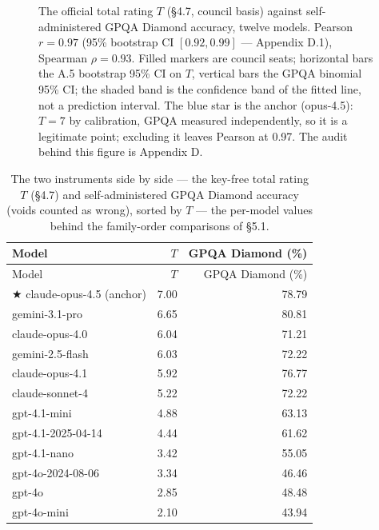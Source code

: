 \begin{figure}
\centering
{}
\caption{The official total rating \(T\) (§4.7, council basis) against self-administered GPQA Diamond accuracy, twelve models. Pearson \(r = 0.97\) (95\% bootstrap CI \([0.92, 0.99]\) --- Appendix D.1), Spearman \(\rho = 0.93\). Filled markers are council seats; horizontal bars the A.5 bootstrap 95\% CI on \(T\), vertical bars the GPQA binomial 95\% CI; the shaded band is the confidence band of the fitted line, not a prediction interval. The blue star is the anchor (opus-4.5): \(T = 7\) by calibration, GPQA measured independently, so it is a legitimate point; excluding it leaves Pearson at 0.97. The audit behind this figure is Appendix D.}
\end{figure}

\protect{}\label{tab-gpqa-values}{}

\begin{longtable}[]{@{}lrr@{}}
\caption{The two instruments side by side --- the key-free total rating \(T\) (§4.7) and self-administered GPQA Diamond accuracy (voids counted as wrong), sorted by \(T\) --- the per-model values behind the family-order comparisons of §5.1.}\tabularnewline
\toprule\noalign{}
Model & \(T\) & GPQA Diamond (\%) \\
\midrule\noalign{}
\endfirsthead
\toprule\noalign{}
Model & \(T\) & GPQA Diamond (\%) \\
\midrule\noalign{}
\endhead
\bottomrule\noalign{}
\endlastfoot
★ claude-opus-4.5 (anchor) & 7.00 & 78.79 \\
gemini-3.1-pro & 6.65 & 80.81 \\
claude-opus-4.0 & 6.04 & 71.21 \\
gemini-2.5-flash & 6.03 & 72.22 \\
claude-opus-4.1 & 5.92 & 76.77 \\
claude-sonnet-4 & 5.22 & 72.22 \\
gpt-4.1-mini & 4.88 & 63.13 \\
gpt-4.1-2025-04-14 & 4.44 & 61.62 \\
gpt-4.1-nano & 3.42 & 55.05 \\
gpt-4o-2024-08-06 & 3.34 & 46.46 \\
gpt-4o & 2.85 & 48.48 \\
gpt-4o-mini & 2.10 & 43.94 \\
\end{longtable}

